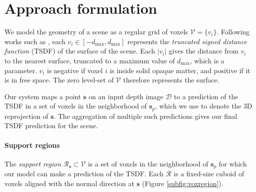 \documentclass[10pt,twocolumn,letterpaper]{article}
\newcommand{\rgbdimage}{\mathcal{D}}
\newcommand{\pixelidx}{\mathbf{s}}
\newcommand{\voxelgrid}{\mathcal{V}}
\newcommand{\voxel}{v}
\newcommand{\voxidx}{i}
\newcommand{\project}{\mathbf{p}}
\begin{document}
\section{Approach formulation}


We model the geometry of a scene as a regular grid of voxels $\voxelgrid = \{\voxel_\voxidx\}$.
Following works such as \cite{izadi-uist-2011, prisacariu-iccv-2011}, each $\voxel_\voxidx \in [-d_{\max}, d_{\max}]$ represents the \emph{truncated signed distance function} (TSDF) of the surface of the scene.
Each $|\voxel_\voxidx|$ gives the distance from $\voxel_\voxidx$ to the nearest surface, truncated to a maximum value of $d_{\max}$, which is a parameter. 
$\voxel_\voxidx$ is negative if voxel $\voxidx$ is inside solid opaque matter, and positive if it is in free space. 
The zero level-set of $\voxelgrid$ therefore represents the surface.

\newcommand{\voxregion}{\mathcal{R}}

Our system maps a point $\pixelidx$ on an input depth image $\rgbdimage$ to a prediction of the TSDF in a set of voxels in the neighborhood of $\pixelidx_p$, which we use to denote the 3D reprojection of $\pixelidx$.
The aggregation of multiple such predictions gives our final TSDF prediction for the scene.




\paragraph{Support regions}
The \emph{support region} $\voxregion_\pixelidx \subset \voxelgrid$ is a set of voxels in the neighborhood of $\pixelidx_p$ for which our model can make a prediction of the TSDF.
Each $\voxregion$ is a fixed-size cuboid of voxels aligned with the normal direction at $\pixelidx$ (Figure \ref{subfig:voxregion}).
\end{document}
